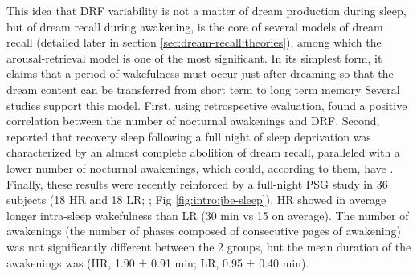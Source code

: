 This idea that DRF variability is not a matter of dream production during sleep, but of dream recall during awakening, is the core of several models of dream recall (detailed later in section \ref{sec:dream-recall:theories}), among which the arousal-retrieval model is one of the most significant. In its simplest form, it claims that a period of wakefulness must occur just after dreaming so that the dream content can be transferred from short term to long term memory \citep{koulack_dream_1976}
Several studies support this model. First, using retrospective evaluation, \citet{schredl_factors_2003} found a positive correlation between the number of nocturnal awakenings and DRF. Second, \citet{de_gennaro_recovery_2010} reported that recovery sleep following a full night of sleep deprivation was characterized by an almost complete abolition of dream recall, paralleled with a lower number of nocturnal awakenings, which could, according to them, have . Finally, these results were recently reinforced by a full-night PSG study in 36 subjects (18 HR and 18 LR; \citealp{eichenlaub_brain_2014}; Fig \ref{fig:intro:jbe-sleep}). HR showed in average longer intra-sleep wakefulness than LR (30 min vs 15 on average). The number of awakenings (the number of phases composed of consecutive pages of awakening) was not significantly different between the 2 groups, but the mean duration of the awakenings was (HR, 1.90 ± 0.91 min; LR, 0.95 ± 0.40 min).

